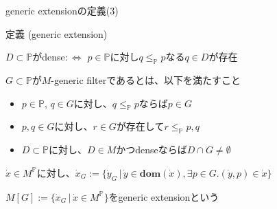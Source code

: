 \documentclass[17pt,aspectratio=169]{beamer}
\newcommand{\Pbb}{\mathbb{P}}
\begin{document}
\begin{frame}{generic extensionの定義(3)}
    \vspace{-7pt}
    \begin{itembox}[l]{定義 (generic extension)}
        {\small
            \vspace{-5pt}
            \textbullet $D \subset \Pbb$がdense$:\Leftrightarrow$ $p \in \Pbb$に対し$q \le_{\Pbb} p$なる$q \in D$が存在

            \vspace{4pt}
            \textbullet $G \subset \Pbb$が$M$-generic filterであるとは、以下を満たすこと
            \vspace{-5pt}
            \begin{itemize}[itemsep=0pt]
                \item [\textasteriskcentered]$p \in \Pbb$, $q \in G$に対し、$q \le_{\Pbb} p$ならば$p \in G$
                \item [\textasteriskcentered]$p, q \in G$に対し、$r \in G$が存在して$r \le_{\Pbb} p, q$
                \item [\textasteriskcentered]$D \subset \Pbb$に対し、$D \in M$かつdenseならば$D \cap G \neq \emptyset$
            \end{itemize}
            \vspace{-3pt}
            \textbullet $\dot{x} \in M^{\Pbb}$に対し、$\dot{x}_G := \{ \dot{y}_G \, | \, \dot{y} \in \bm{\mathbf{dom}}(\dot{x}), \exists p \in G. (\dot{y}, p) \in \dot{x} \}$ 

            \textbullet $M[G] := \{ \dot{x}_G \, | \, \dot{x} \in M^{\Pbb} \}$をgeneric extensionという
        }
    \end{itembox}    
\end{frame}
\end{document}
